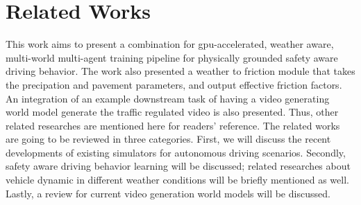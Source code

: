 \section{Related Works}
\label{sec:Related Works}
This work aims to present a combination for gpu-accelerated, weather aware, multi-world multi-agent training pipeline for physically grounded safety aware driving behavior. The work also presented a weather to friction module that takes the precipation and pavement parameters, and output effective friction factors. An integration of an example downstream task of having a video generating world model generate the traffic regulated video is also presented. Thus, other related researches are mentioned here for readers' reference. The related works are going to be reviewed in three categories. First, we will discuss the recent developments of existing simulators for autonomous driving scenarios. Secondly, safety aware driving behavior learning will be discussed; related researches about vehicle dynamic in different weather conditions will be briefly mentioned as well. Lastly, a review for current video generation world models will be discussed. 

